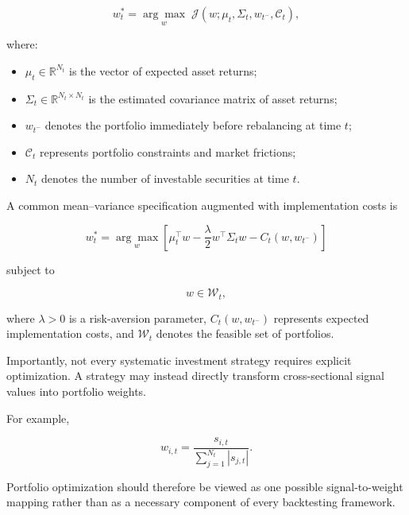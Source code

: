 \documentclass[11pt,a4paper]{article}
\begin{document}
\begin{equation}
w_t^*
=
\underset{w}{\arg\max}
\;
\mathcal{J}
\left(
w;
\mu_t,
\Sigma_t,
w_{t^-},
\mathcal{C}_t
\right),
\end{equation}

where:

\begin{itemize}
    \item $\mu_t \in \mathbb{R}^{N_t}$ is the vector of expected asset returns;

    \item $\Sigma_t \in \mathbb{R}^{N_t \times N_t}$ is the estimated covariance
    matrix of asset returns;

    \item $w_{t^-}$ denotes the portfolio immediately before rebalancing at
    time $t$;

    \item $\mathcal{C}_t$ represents portfolio constraints and market frictions;

    \item $N_t$ denotes the number of investable securities at time $t$.
\end{itemize}

A common mean--variance specification augmented with implementation costs is

\begin{equation}
\boxed{
w_t^*
=
\underset{w}{\arg\max}
\left[
\mu_t^\top w
-
\frac{\lambda}{2}
w^\top \Sigma_t w
-
C_t(w,w_{t^-})
\right]
}
\end{equation}

subject to

\begin{equation}
w \in \mathcal{W}_t,
\end{equation}

where $\lambda>0$ is a risk-aversion parameter,
$C_t(w,w_{t^-})$ represents expected implementation costs, and
$\mathcal{W}_t$ denotes the feasible set of portfolios.

Importantly, not every systematic investment strategy requires explicit
optimization. A strategy may instead directly transform cross-sectional signal
values into portfolio weights.

For example,

\begin{equation}
w_{i,t}
=
\frac{s_{i,t}}
{\sum_{j=1}^{N_t}|s_{j,t}|}.
\end{equation}

Portfolio optimization should therefore be viewed as one possible
signal-to-weight mapping rather than as a necessary component of every
backtesting framework.
\end{document}
